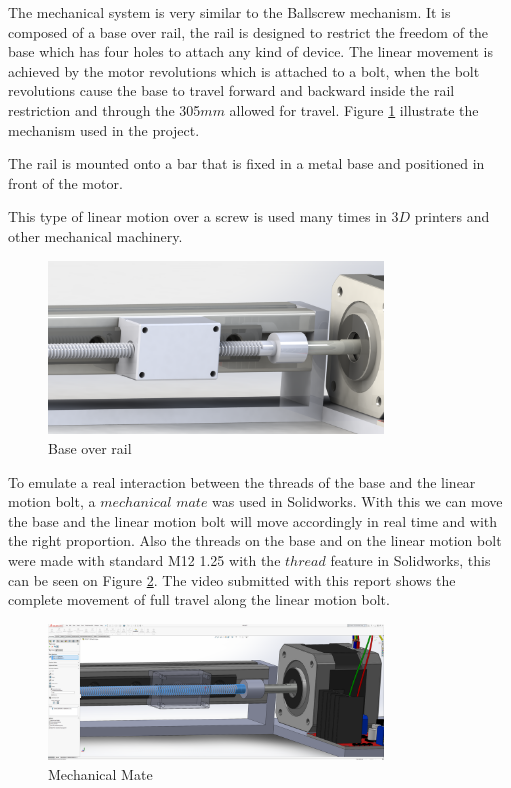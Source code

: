 \documentclass[transmag]{IEEEtran}
\begin{document}
The mechanical system is very similar to the Ballscrew mechanism. It is composed of a base over rail, the rail is designed to restrict the freedom of the base which has four holes to attach any kind of device. The linear movement is achieved by the motor revolutions which is attached to a bolt, when the bolt revolutions cause the base to travel forward and backward inside the rail restriction and through the 305$mm$ allowed for travel. Figure \ref{ASS4-PrinterHead} illustrate the mechanism used in the project.

The rail is mounted onto a bar that is fixed in a metal base and positioned in front of the motor.

This type of linear motion over a screw is used many times in $3D$ printers and other mechanical machinery. 


\begin{figure}[H]
\centerline{\includegraphics[width=3.5in]{./images/ASS4-PrinterHead}}
\caption{Base over rail\label{ASS4-PrinterHead}}
\end{figure}

To emulate a real interaction between the threads of the base and the linear motion bolt, a $mechanical$ $mate$ was used in Solidworks. With this we can move the base and the linear motion bolt will move accordingly in real time and with the right proportion. Also the threads on the base and on the linear motion bolt were made with standard M12 1.25 with the $thread$ feature in Solidworks, this can be seen on Figure \ref{ASS4-MechanicalMate}. The video submitted with this report shows the complete movement of full travel along the linear motion bolt.

\begin{figure}[H]
\centerline{\includegraphics[width=3.5in]{./images/ASS4-MechanicalMate}}
\caption{Mechanical Mate\label{ASS4-MechanicalMate}}
\end{figure}
\end{document}
